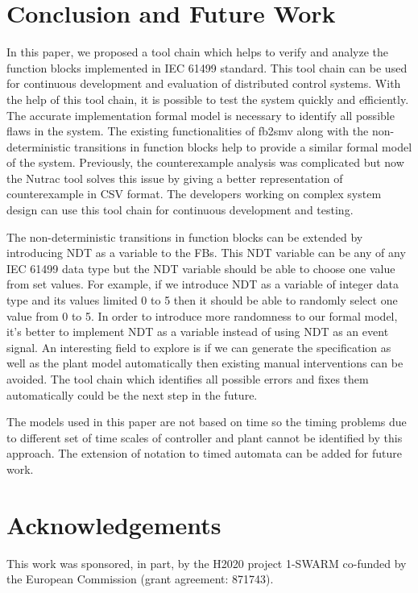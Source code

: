\begin{bibunit}
\section{Conclusion and Future Work}


In this paper, we proposed a tool chain which helps to verify and analyze the function blocks implemented in IEC 61499 standard.  This tool chain can be used for continuous development and evaluation of distributed control systems.  With the help of this tool chain,  it is possible to test the system quickly and efficiently. The accurate implementation formal model is necessary to identify all possible flaws in the system.  The existing functionalities of fb2smv along with the non-deterministic transitions in function blocks help to provide a similar formal model of the system.  Previously, the counterexample  analysis was complicated but now the Nutrac tool solves this issue by giving  a better representation of counterexample in CSV format. The developers working on complex system design can use this tool chain for continuous development and testing.


The non-deterministic transitions  in function blocks can be extended by introducing NDT as a variable to the FBs. This NDT variable can be any of any IEC 61499 data type but the NDT variable should be able to choose one value from set values.  For example, if we introduce NDT as a variable of integer data type and its values  limited 0 to 5 then it should be able to randomly select one value from 0 to 5.  In order to introduce more randomness to our formal model, it's better to implement NDT as a variable instead of using NDT as an event signal.  An interesting field to explore is if we can generate  the specification as well as the plant model automatically then existing manual interventions can be avoided. The tool chain which identifies all possible errors and fixes them automatically could be the next step in the future.

The models used in this paper are not based on time so the timing problems due to different set of time scales of controller and plant cannot be identified by this approach. The extension of notation to timed automata can be added for future work.

\section{Acknowledgements}
This work was sponsored, in part, by the H2020 project 1-SWARM co-funded by the European Commission (grant agreement: 871743).  

\putbib
\end{bibunit}
